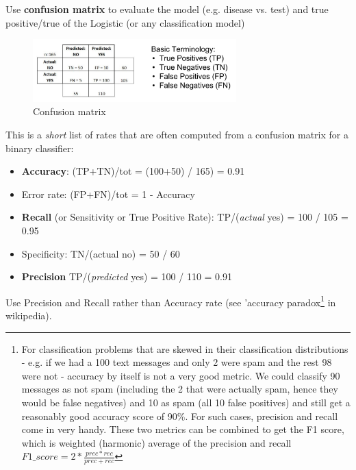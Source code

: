 \documentclass[12pt]{article}
\begin{document}
Use \textbf{confusion matrix} to evaluate the model (e.g. disease vs. test) and true positive/true of the Logistic (or any classification model)
\begin{figure}[htbp] 
	\centering
	\includegraphics[width=0.7\textwidth]{pics/confusion_matrix}
	\caption{Confusion matrix}  
\end{figure}

This is a \textit{short} list of rates that are often computed from a confusion matrix for a binary classifier:
\begin{itemize}
	\item \textbf{Accuracy}: (TP+TN)/tot = (100+50) / 165) = 0.91
	\item Error rate: (FP+FN)/tot = 1 - Accuracy
	\item \textbf{Recall} (or Sensitivity or True Positive Rate): TP/(\textit{actual} yes) = 100 / 105 = 0.95
	\item Specificity: TN/(actual no) = 50 / 60
	\item \textbf{Precision} TP/(\textit{predicted} yes) = 100 / 110 = 0.91
\end{itemize}
Use Precision and Recall rather than Accuracy rate (see 'accuracy paradox\footnote{For classification problems that are skewed in their classification distributions - e.g. if we had a 100 text messages and only 2 were spam and the rest 98 were not - accuracy by itself is not a very good metric. We could classify 90 messages as not spam (including the 2 that were actually spam, hence they would be false negatives) and 10 as spam (all 10 false positives) and still get a reasonably good accuracy score of 90\%. For such cases, precision and recall come in very handy. These two metrics can be combined to get the F1 score, which is weighted (harmonic) average of the precision and recall $F1\_score = 2 * \frac{prec * rec}{prec + rec}$} in wikipedia).
\end{document}
